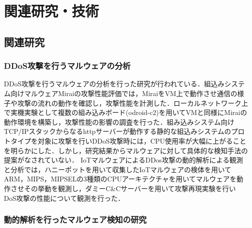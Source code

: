 \chapter{関連研究・技術}
 
\section{関連研究}

\subsection{DDoS攻撃を行うマルウェアの分析}
DDoS攻撃を行うマルウェアの分析を行った研究が行われている．組込みシステム向けマルウェアMiraiの攻撃性能評価では，MiraiをVM上で動作させ通信の様子や攻撃の流れの動作を確認し，攻撃性能を計測した．ローカルネットワーク上で実機実験として複数の組み込みボード(odroid-c2)を用いてVMと同様にMiraiの動作環境を構築し，攻撃性能の影響の調査を行った．組み込みシステム向けTCP/IPスタックからなるhttpサーバーが動作する静的な組込みシステムのプロトタイプを対象に攻撃を行いDDoS攻撃時には，CPU使用率が大幅に上がることを明らかにした．しかし，研究結果からマルウェアに対して具体的な検知手法の提案がなされていない．
IoTマルウェアによるDDos攻撃の動的解析による観測と分析では，ハニーポットを用いて収集したIoTマルウェアの検体を用いてARM，MIPS，MIPSELの3種類のCPUアーキテクチャを用いてマルウェアを動作させその挙動を観測し，ダミーC\&Cサーバーを用いて攻撃再現実験を行いDoS攻撃の性能について観測を行った．

\subsection{動的解析を行ったマルウェア検知の研究} %

